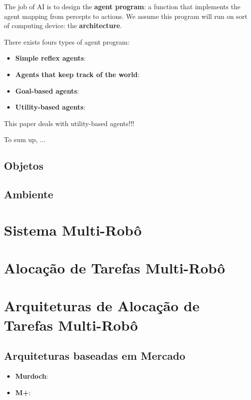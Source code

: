         The job of AI is to design the \textbf{agent program}: a function that implements the agent mapping from percepts to actions. We assume this program will run on sort of computing device: the \textbf{architecture}.
        
        There exists fours types of agent program:
        \begin{itemize}
            \item \textbf{Simple reflex agents}:
            \item \textbf{Agents that keep track of the world}:
            \item \textbf{Goal-based agents}:
            \item \textbf{Utility-based agents}:
        \end{itemize}
        
        This paper deals with utility-based agents!!!
        
        To sum up, ...
        
        
        \subsection{Objetos}
        
        \subsection{Ambiente}
        
        \section{Sistema Multi-Robô}
        
        \section{Alocação de Tarefas Multi-Robô}
        
        \section{Arquiteturas de Alocação de Tarefas Multi-Robô}
        
        \subsection{Arquiteturas baseadas em Mercado}
        
        \begin{itemize}
            \item \textbf{Murdoch}:
            \item \textbf{M+}:
        \end{itemize}
        
